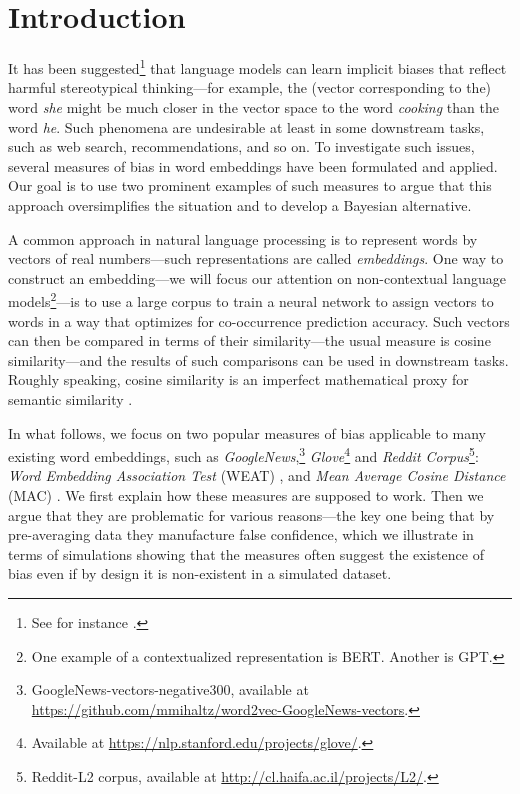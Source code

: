 \documentclass{clv3}
\begin{document}
\hypertarget{introduction}{%
\section{Introduction}\label{introduction}}

It has been suggested\footnote{See for instance \citep{Bolukbasi2016man, Caliskan2017semanticsBiases, Gonen2019lipstick, Lauscher2019multidimensional, Garg2018years, Manzini2019blackToCriminal}.}
that language models can learn implicit biases that reflect harmful
stereotypical thinking---for example, the (vector corresponding to the)
word \textit{she} might be much closer in the vector space to the word
\textit{cooking} than the word \textit{he}. Such phenomena are
undesirable at least in some downstream tasks, such as web search,
recommendations, and so on. To investigate such issues, several measures
of bias in word embeddings have been formulated and applied. Our goal is
to use two prominent examples of such measures to argue that this
approach oversimplifies the situation and to develop a Bayesian
alternative.

A common approach in natural language processing is to represent words
by vectors of real numbers---such representations are called
\emph{embeddings}. One way to construct an embedding---we will focus our
attention on non-contextual language models\footnote{One example of a
  contextualized representation is BERT. Another is GPT.}---is to use a
large corpus to train a neural network to assign vectors to words in a
way that optimizes for co-occurrence prediction accuracy. Such vectors
can then be compared in terms of their similarity---the usual measure is
cosine similarity---and the results of such comparisons can be used in
downstream tasks. Roughly speaking, cosine similarity is an imperfect
mathematical proxy for semantic similarity \citep{Mikolov2013efficient}.

In what follows, we focus on two popular measures of bias applicable to
many existing word embeddings, such as
\emph{GoogleNews},\footnote{GoogleNews-vectors-negative300, available at  \url{https://github.com/mmihaltz/word2vec-GoogleNews-vectors}.}
\emph{Glove}\citet{Pennington2014Glove}\footnote{Available at \url{https://nlp.stanford.edu/projects/glove/}.}
and
\emph{Reddit Corpus}\citet{Rabinovich2018Reddit}\footnote{Reddit-L2 corpus, available at  \url{http://cl.haifa.ac.il/projects/L2/}.}:
\emph{Word Embedding Association Test} (\textsf{WEAT}) \citep{Caliskan2017semanticsBiases}, and
\emph{Mean Average Cosine Distance} (\textsf{MAC}) \citep{Manzini2019blackToCriminal}. We first
explain how these measures are supposed to work. Then we argue that they
are problematic for various reasons---the key one being that by
pre-averaging data they manufacture false confidence, which we
illustrate in terms of simulations showing that the measures often
suggest the existence of bias even if by design it is non-existent in a
simulated dataset.
\end{document}
